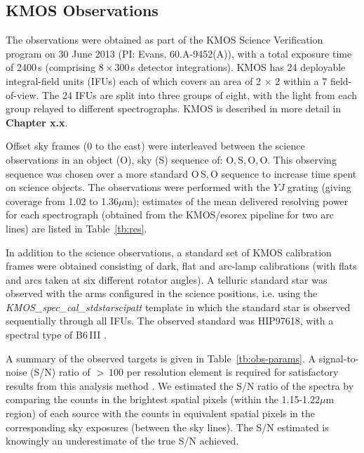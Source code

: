 
\subsection{KMOS Observations} %
\label{sub:observations}

The observations were obtained as part of the KMOS Science Verification program on 30 June 2013 (PI: Evans, 60.A-9452(A)),
with a total exposure time of 2400\,s
(comprising 8\,$\times$\,300\,s detector integrations).
KMOS has 24 deployable integral-field units (IFUs) each of which covers an area of
2 $\times$ 2 within a 7 field-of-view.
The 24 IFUs are split into three groups of eight, with the light from each group relayed to different spectrographs.
KMOS is described in more detail in \textbf{Chapter x.x}.

Offset sky frames
(0 to the east) were interleaved between the science observations in an object (O), sky (S) sequence of:
O,\,S,\,O,\,O.
This observing sequence was chosen over a more standard O\,S,\,O sequence to increase time spent on science objects.
The observations were performed with the $YJ$ grating
(giving coverage from 1.02 to 1.36$\mu$m);
estimates of the mean delivered resolving power for each spectrograph (obtained from the KMOS/esorex pipeline for two arc lines) are listed in Table~\ref{tb:res}.

In addition to the science observations, a standard set of KMOS calibration frames were obtained consisting of dark, flat and arc-lamp calibrations (with flats and arcs taken at six different rotator angles).
A telluric standard star was observed with the arms configured in the science positions, i.e. using the {\em KMOS\_spec\_cal\_stdstarscipatt} template in which the standard star is observed sequentially through all IFUs.
The observed standard was HIP97618, with a spectral type of B6\,III
\citep{1988mcts.book.....H}.

A summary of the observed targets is given in
Table~\ref{tb:obs-params}.
A signal-to-noise (S/N) ratio of $>~100$ per resolution element is required for satisfactory results from this analysis method
\citep[see][]{2014ApJ...788...58G}.
We estimated the S/N ratio of the spectra by comparing the counts in the brightest spatial pixels
(within the 1.15-1.22$\mu$m region) of each source with the counts in equivalent spatial pixels in the corresponding sky exposures
(between the sky lines).
The S/N estimated is knowingly an underestimate of the true S/N achieved.

